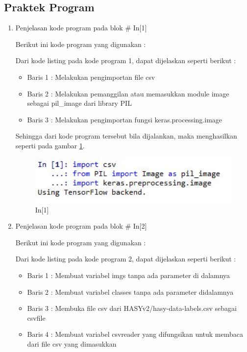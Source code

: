 \subsection{Praktek Program}
\begin{enumerate}
\item Penjelasan kode program pada blok \# In[1]
\par Berikut ini kode program yang digunakan :

\par Dari kode listing pada kode program 1, dapat dijelaskan seperti berikut :
\begin{itemize}
\item Baris 1	: Melakukan pengimportan file csv
\item Baris 2	: Melakukan pemanggilan atau memasukkan module image sebagai pil\_image dari library PIL
\item Baris 3	: Melakukan pengimportan fungsi keras.processing.image 
\end{itemize}
\par Sehingga dari kode program tersebut bila dijalankan, maka menghasilkan seperti pada gambar \ref{c7t_8}.
\begin{figure}[!htbp]
\centerline{\includegraphics[width=1\textwidth]{figures/c7t/8.JPG}}
\caption{In[1]}
\label{c7t_8}
\end{figure}
\item Penjelasan kode program pada blok \# In[2]
\par Berikut ini kode program yang digunakan :

\par Dari kode listing pada kode program 2, dapat dijelaskan seperti berikut :
\begin{itemize}
\item Baris 1	: Membuat variabel imgs tanpa ada parameter di dalamnya
\item Baris 2	: Membuat variabel classes tanpa ada parameter didalamnya
\item Baris 3	: Membuka file csv dari HASYv2/hasy-data-labels.csv sebagai csvfile
\item Baris 4	: Membuat variabel csvreader yang difungsikan untuk membaca dari file csv yang dimasukkan

\end{itemize}
\end{enumerate}

